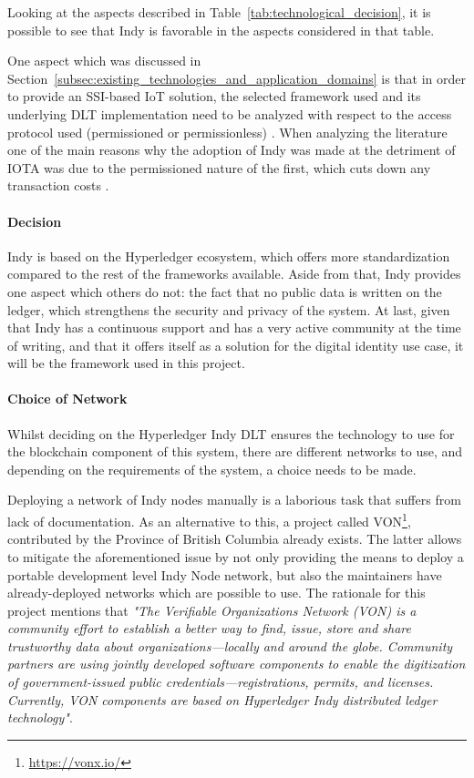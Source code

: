 Looking at the aspects described in Table~\ref{tab:technological_decision}, it is possible to see that Indy is favorable in the aspects considered in that table. 

One aspect which was discussed in Section~\ref{subsec:existing_technologies_and_application_domains} is that in order to provide an SSI-based IoT solution, the selected framework used and its underlying DLT implementation need to be analyzed with respect to the access protocol used (permissioned or permissionless) \cite{luecking2020decentralized}.
When analyzing the literature one of the main reasons why the adoption of Indy was made at the detriment of IOTA \cite{zhu2018identity} was due to the permissioned nature of the first, which cuts down any transaction costs \cite{lo2019analysis}.

\paragraph{Decision}

Indy is based on the Hyperledger ecosystem, which offers more standardization compared to the rest of the frameworks available.
Aside from that, Indy provides one aspect which others do not: the fact that no public data is written on the ledger, which strengthens the security and privacy of the system.
At last, given that Indy has a continuous support and has a very active community at the time of writing, and that it offers itself as a solution for the digital identity use case, it will be the framework used in this project.\\

\paragraph{Choice of Network}

Whilst deciding on the Hyperledger Indy DLT ensures the technology to use for the blockchain component of this system, there are different networks to use, and depending on the requirements of the system, a choice needs to be made.

Deploying a network of Indy nodes manually is a laborious task that suffers from lack of documentation. As an alternative to this, a project called \acrfull{VON}\footnote{\label{vonx}\url{https://vonx.io/}}, contributed by the Province of British Columbia already exists. The latter allows to mitigate the aforementioned issue by not only providing the means to deploy a portable development level Indy Node network, but also the maintainers have already-deployed networks which are possible to use. The rationale for this project mentions that \textit{"The Verifiable Organizations Network (VON) is a community effort to establish a better way to find, issue, store and share trustworthy data about organizations—locally and around the globe. Community partners are using jointly developed software components to enable the digitization of government-issued public credentials—registrations, permits, and licenses. Currently, VON components are based on Hyperledger Indy distributed ledger technology"}.

